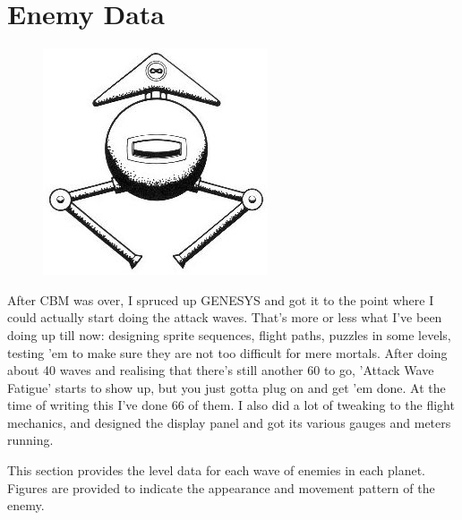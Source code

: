 \chapter{Enemy Data}

\begin{definition}
\setlength{\intextsep}{0pt}%
\setlength{\columnsep}{3pt}%
\begin{figure}
\includegraphics[width=\linewidth]{src/callout/ia.jpg} 
\end{figure}
\small
After CBM was over, I spruced up GENESYS and got it to the point where I could
  actually start doing the attack waves. That's more or less what I've been
  doing up till now: designing sprite sequences, flight paths, puzzles in some
  levels, testing 'em to make sure they are not too difficult for mere mortals.
  After doing about 40 waves and realising that there's still another 60 to go,
  'Attack Wave Fatigue' starts to show up, but you just gotta plug on and get
  'em done. At the time of writing this I've done 66 of them. I also did a lot
  of tweaking to the flight mechanics, and designed the display panel and got
  its various gauges and meters running.
\end{definition}

This section provides the level data for each wave of enemies in each
planet. Figures are provided to indicate the appearance and movement
pattern of the enemy.



